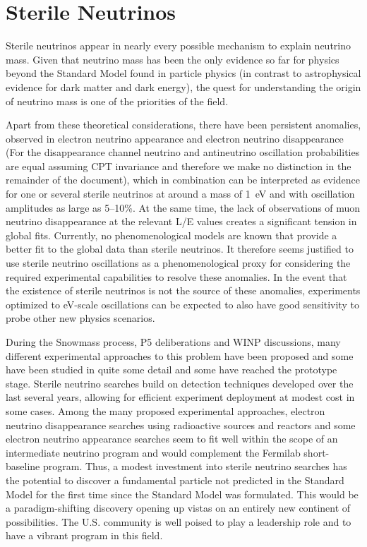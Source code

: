 \section{Sterile Neutrinos}
\label{sec:Sterile}

Sterile neutrinos appear in nearly every possible mechanism to explain
neutrino mass. Given that neutrino mass has been the only evidence so
far for physics beyond the Standard Model found in particle physics
(in contrast to astrophysical evidence for dark matter and dark
energy), the quest for understanding the origin of neutrino mass is
one of the priorities of the field.

Apart from these theoretical considerations, there have been
persistent anomalies, observed in electron neutrino appearance and
electron neutrino disappearance (For the disappearance channel
neutrino and antineutrino oscillation probabilities are equal assuming
CPT invariance and therefore we make no distinction in the remainder of
the document), which in combination can be interpreted as evidence
for one or several sterile neutrinos at around a mass of 1~eV and with
oscillation amplitudes as large as 5--10\%. At the same time, the lack
of observations of muon neutrino disappearance at the relevant L/E
values creates a significant tension in global fits. Currently, no
phenomenological models are known that provide a better fit to the
global data than sterile neutrinos. It therefore seems justified to
use sterile neutrino oscillations as a phenomenological proxy for
considering the required experimental capabilities to resolve these
anomalies. In the event that the existence of sterile neutrinos is not
the source of these anomalies, experiments optimized to eV-scale
oscillations can be expected to also have good sensitivity to probe
other new physics scenarios.

During the Snowmass process, P5 deliberations and WINP discussions,
many different experimental approaches to this problem have been
proposed and some have been studied in quite some detail and some have
reached the prototype stage. Sterile neutrino searches build on
detection techniques developed over the last several years, allowing
for efficient experiment deployment at modest cost in some cases.
Among the many proposed experimental approaches, electron neutrino
disappearance searches using radioactive sources and reactors and some
electron neutrino appearance searches seem to fit well within the
scope of an intermediate neutrino program and would complement the
Fermilab short-baseline program. Thus, a modest investment into
sterile neutrino searches has the potential to discover a fundamental 
particle not
predicted in the Standard Model for the first time since the Standard
Model was formulated. This would be a paradigm-shifting discovery
opening up vistas on an entirely new continent of possibilities. The
U.S. community is well poised to play a leadership role and to have a
vibrant program in this field.

